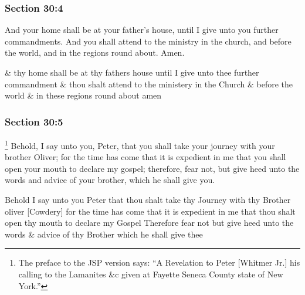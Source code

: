 	\subsubsection{Section 30:4} %
		\label{DC30-4}

		And your home shall be at your father's house, until I give unto you further commandments.  And you shall attend to the ministry in the church, and before the world, and in the regions round about.  Amen.

		\begin{framed}
		\scriptsize
			\begin{compactdesc}
				\item[JSP] \& thy home shall be at thy fathers house until I give unto thee further commandment \& thou shalt attend to the ministery in the Church \& before the world \& in these regions round about amen
			\end{compactdesc}
		\end{framed}

	\subsubsection{Section 30:5} %
		\label{DC30-5}

			\footnote{%
				The preface to the JSP version says: ``A Revelation to Peter [Whitmer Jr.] his calling to the Lamanites \&c given at Fayette Seneca County state of New York.''
				}%
		Behold, I say unto you, Peter, that you shall take your journey with your brother Oliver; for the time has come that it is expedient in me that you shall open your mouth to declare my gospel; therefore, fear not, but give heed unto the words and advice of your brother, which he shall give you.

		\begin{framed}
		\scriptsize
			\begin{compactdesc}
				\item[JSP] Behold I say unto you Peter that thou shalt take thy Journey with thy Brother oliver [Cowdery] for the time has come that it is expedient in me that thou shalt open thy mouth to declare my Gospel Therefore fear not but give heed unto the words \& advice of thy Brother which he shall give thee
			\end{compactdesc}
		\end{framed}

